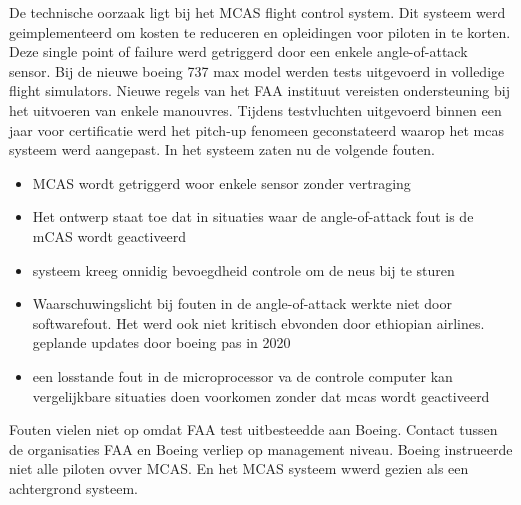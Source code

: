 \documentclass{article}
\begin{document}
	De technische oorzaak ligt bij het MCAS flight control system. Dit systeem werd geimplementeerd om kosten te reduceren en opleidingen voor piloten  in te korten.  Deze single point of failure \cite{uran05042019SPOF}
	werd getriggerd door een enkele angle-of-attack sensor\cite{boeing737maxdisplay}.
	 Bij de  nieuwe boeing 737 max model werden tests uitgevoerd in volledige flight simulators. Nieuwe   regels van het FAA instituut vereisten ondersteuning bij het uitvoeren van enkele manouvres. Tijdens testvluchten uitgevoerd binnen een jaar voor certificatie werd het pitch-up fenomeen geconstateerd waarop het mcas systeem werd aangepast. 
	In het  systeem zaten nu de volgende fouten.
	
	\begin{itemize}
		\item MCAS wordt getriggerd woor enkele sensor zonder vertraging
		\item Het ontwerp staat toe dat  in situaties waar de angle-of-attack fout is de mCAS wordt geactiveerd
		\item systeem kreeg onnidig bevoegdheid controle om de neus bij te sturen
		\item  Waarschuwingslicht bij fouten in de angle-of-attack werkte niet door  softwarefout. Het werd ook niet kritisch ebvonden door ethiopian airlines. geplande updates door boeing pas in 2020
		\item een losstande fout in de microprocessor va de controle computer kan vergelijkbare situaties doen voorkomen zonder dat mcas wordt geactiveerd
	\end{itemize}
	Fouten vielen niet op omdat FAA test uitbesteedde aan Boeing. Contact tussen de organisaties FAA en Boeing verliep op management niveau. Boeing instrueerde niet alle piloten ovver MCAS. En het MCAS systeem wwerd gezien als een achtergrond  systeem.
	
\end{document}
